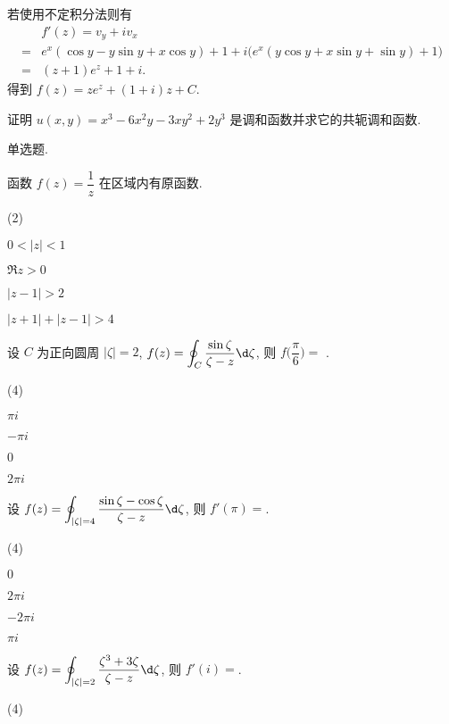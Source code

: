 若使用不定积分法则有
\begin{align*}
   &f'(z)=v_y+iv_x\\
  =&e^x(\cos y-y\sin y+x\cos y)+1+i\bigl(e^x(y\cos y+x\sin y+\sin y)+1\bigr)\\
  =&(z+1)e^z+1+i.
\end{align*}
得到 $f(z)=ze^z+(1+i)z+C$.
\begin{exercise}
  证明 $u(x,y)=x^3-6x^2y-3xy^2+2y^3$ 是调和函数并求它的共轭调和函数.
\end{exercise}






\sectionHomework
\begin{homework}
  \item 单选题.
  \begin{subex}
    \item 函数 $f(z)=\dfrac 1z$ 在区域\fillbrace{}内有原函数.
    \begin{exchoice}(2)
      \item $0<|z|<1$
      \item $\Re z>0$
      \item $|z-1|>2$
      \item $|z+1|+|z-1|>4$
    \end{exchoice}
    \item 设 $C$ 为正向圆周 $|\zeta|=2$, $\displaystyle f(z)=\oint_C\frac{\sin \zeta}{\zeta-z}\d \zeta$, 则 $f\bigl(\dfrac\pi6\bigr)=$ \fillbrace{}.
    \begin{exchoice}(4)
      \item $\pi i$
      \item $-\pi i$
      \item $0$
      \item $2\pi i$
    \end{exchoice}
    \item 设 $f(z)=\displaystyle\oint_{|\zeta|=4}\dfrac{\sin\zeta-\cos\zeta}{\zeta-z}\d\zeta$, 则 $f'(\pi)=$\fillbrace{}.
    \begin{exchoice}(4)
      \item $0$
      \item $2\pi i$
      \item $-2\pi i$
      \item $\pi i$
    \end{exchoice}
    \item 设 $f(z)=\displaystyle\oint_{|\zeta|=2}\dfrac{\zeta^3+3\zeta}{\zeta-z}\d\zeta$, 则 $f'(i)=$\fillbrace{}.
    \begin{exchoice}(4)

\end{exchoice}
\end{subex}
\end{homework}
